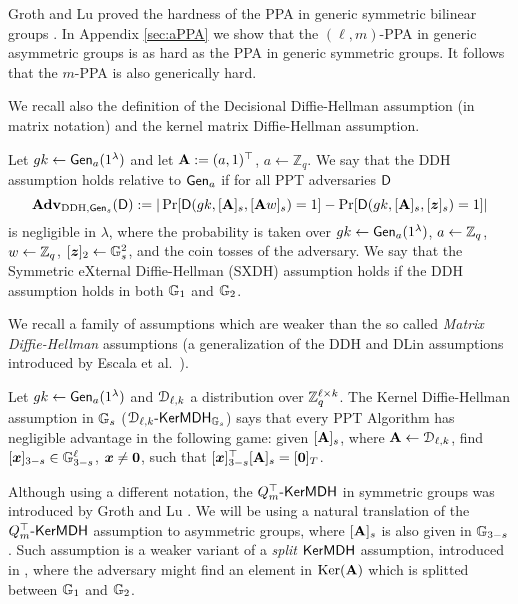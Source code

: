 Groth and Lu proved the hardness of the PPA in generic symmetric bilinear groups \cite{AC:GroLu07}. In Appendix \ref{sec:aPPA} we show that the $(\ell,m)$-PPA in generic asymmetric groups is as hard as the PPA in generic symmetric groups. It follows that the $m$-PPA is also generically hard.

We recall also the definition of the Decisional Diffie-Hellman assumption (in matrix notation) and the kernel matrix Diffie-Hellman assumption.

\begin{definition}\label{def:dlin}
 Let  ${gk} 
\gets \mathsf{Gen}_a(1^\lambda)$ and let $\mathbf{{A}} := (a,1)^\top$, $a\gets\mathbb{Z}_q$.
We say that the DDH assumption holds relative to $\mathsf{Gen}_a$ if for all PPT adversaries $\mathsf{D}$
$$
\mathbf{Adv}_{\mathrm{DDH},\mathsf{Gen}_s}(\mathsf{D}) := |
	\Pr[
		\mathsf{D}(
			gk,
			[\mathbf{{A}}]_s,
			[\mathbf{{A}}{w}]_s)=1]
	-\Pr[
		\mathsf{D}(
		gk,
		[\mathbf{{A}}]_s,
		[{\boldsymbol{z}}]_s)=1]|
$$
is negligible in $\lambda$, where the probability is taken over $gk\gets\mathsf{Gen}_a(1^\lambda)$, $a\gets\mathbb{Z}_q$, ${w}\gets\mathbb{Z}_q$, $[{\boldsymbol{z}}]_2\gets\mathbb{G}^2_s$, and the coin tosses of the adversary.
We say that the Symmetric eXternal Diffie-Hellman (SXDH) assumption holds if the DDH assumption holds in both $\mathbb{G}_1$ and $\mathbb{G}_2$.
\end{definition}

We recall a family of assumptions which are weaker than the so called \emph{Matrix Diffie-Hellman} assumptions (a generalization of the DDH and DLin assumptions introduced by Escala et al.~\cite{C:EHKRV13}).
\begin{definition} Let  ${gk} 
\gets\mathsf{Gen}_a(1^\lambda)$ and $\mathcal{D}_{\ell,k}$ a distribution over $\mathbb{Z}_q^{\ell\times k}$.
The Kernel Diffie-Hellman assumption in $\mathbb{G}_s$ ($\mathcal{D}_{\ell,k}\mbox{-}\mathsf{KerMDH}_{\mathbb{G}_s}$) says that every PPT Algorithm has negligible advantage in the following  game: given $[\mathbf{{A}}]_s$, where $\mathbf{{A}} \gets \mathcal{D}_{\ell,k}$, find $[{\boldsymbol{x}}]_{3-s} \in \mathbb{G}^{\ell}_{3-s}$, ${\boldsymbol{x}} \neq {\boldsymbol{0}}$, such that 
$[{\boldsymbol{x}}]_{3-s}^{\top}[\mathbf{{A}}]_s=[{\boldsymbol{0}}]_T$. 
\end{definition}
Although using a different notation, the $Q_m^\top\mbox{-}\mathsf{KerMDH}$ in symmetric groups was introduced by Groth and Lu \cite{AC:GroLu07}.
We will be using a natural translation of the $Q_m^\top\mbox{-}\mathsf{KerMDH}$ assumption to asymmetric groups, where  $[\mathbf{{A}}]_s$ is also given in $\mathbb{G}_{3-s}$.  Such assumption is a weaker variant of a \emph{split} $\mathsf{KerMDH}$ assumption, introduced in \cite{AC:GonHevRaf15}, where the adversary might find an element in $\mathrm{Ker}(\mathbf{{A}})$ which is splitted between $\mathbb{G}_1$ and $\mathbb{G}_2$.

